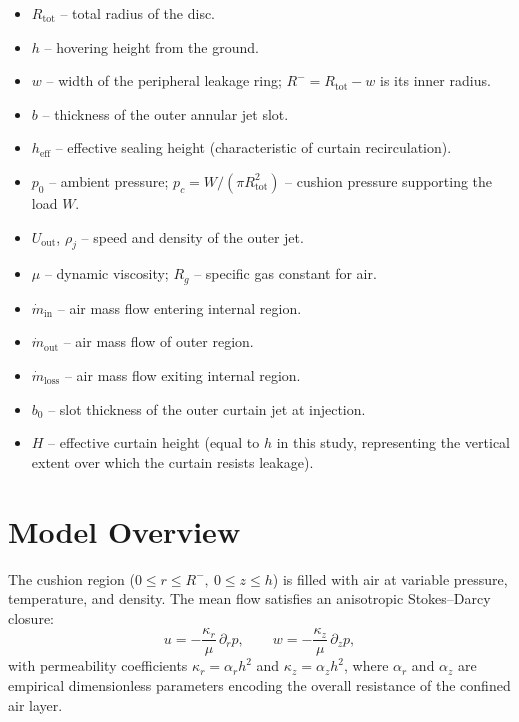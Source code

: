 \documentclass[11pt,a4paper]{article}
\begin{document}
\begin{itemize}
  \item $R_{\mathrm{tot}}$ -- total radius of the disc.
  \item $h$ -- hovering height from the ground.
  \item $w$ -- width of the peripheral leakage ring; $R^{-}=R_{\mathrm{tot}}-w$ is its inner radius.
  \item $b$ -- thickness of the outer annular jet slot.
  \item $h_{\mathrm{eff}}$ -- effective sealing height (characteristic of curtain recirculation).
  \item $p_0$ -- ambient pressure; $p_c=W/(\pi R_{\mathrm{tot}}^2)$ -- cushion pressure supporting the load $W$.
  \item $U_{\mathrm{out}}$, $\rho_j$ -- speed and density of the outer jet.
  \item $\mu$ -- dynamic viscosity; $R_g$ -- specific gas constant for air.
  \item $\dot{m}_{\mathrm{in}}$ -- air mass flow entering internal region.
  \item $\dot{m}_{\mathrm{out}}$ -- air mass flow of outer region.
  \item $\dot{m}_{\mathrm{loss}}$ -- air mass flow exiting internal region.
  \item $b_0$ -- slot thickness of the outer curtain jet at injection.
  \item $H$ -- effective curtain height (equal to $h$ in this study, representing the vertical extent over which the curtain resists leakage).
\end{itemize}

\section{Model Overview}
\label{sec:model-overview}

The cushion region ($0\le r\le R^{-},\ 0\le z\le h$) is filled with air at variable pressure, temperature, and density.
The mean flow satisfies an anisotropic Stokes--Darcy closure:
\begin{equation}
  u = -\frac{\kappa_r}{\mu}\,\partial_r p,\qquad
  w = -\frac{\kappa_z}{\mu}\,\partial_z p,
\end{equation}
with permeability coefficients $\kappa_r=\alpha_r h^2$ and $\kappa_z=\alpha_z h^2$, where $\alpha_r$ and $\alpha_z$ are empirical dimensionless parameters encoding the overall resistance of the confined air layer.
\end{document}
